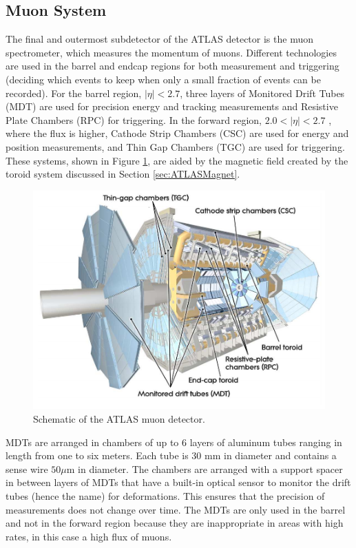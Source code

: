 \subsection{Muon System}
\label{sec:MuCal}
The final and outermost subdetector of the ATLAS detector is the muon spectrometer, which measures the momentum of muons.  Different technologies are used in the barrel and endcap regions for both measurement and triggering (deciding which events to keep when only a small fraction of events can be recorded).  For the barrel region, $|\eta|<2.7$, three layers of Monitored Drift Tubes (MDT) are used for precision energy and tracking measurements and Resistive Plate Chambers (RPC) for triggering.  In the forward region, $2.0<|\eta|<2.7$ , where the flux is higher, Cathode Strip Chambers (CSC) are used for energy and position measurements, and Thin Gap Chambers (TGC) are used for triggering.  These systems, shown in Figure \ref{fig:ATLASMuonSys}, are aided by the magnetic field created by the toroid system discussed in Section \ref{sec:ATLASMagnet}.
\begin{figure}[h!]
	\centering
	\includegraphics[width=\columnwidth]{../ThesisImages/LHCImages/ATLASMuonSystem.png}
	\caption[Schematic of the ATLAS muon detector.]{Schematic of the ATLAS muon detector.\cite{ATLAS}
	}
	\label{fig:ATLASMuonSys}
\end{figure}

MDTs are arranged in chambers of up to 6 layers of aluminum tubes ranging in length from one to six meters.  Each tube is 30 mm in diameter and contains a sense wire $50\mu\text{m}$ in diameter.  The chambers are arranged with a support spacer in between layers of MDTs that have a built-in optical sensor to monitor the drift tubes (hence the name) for deformations.  This ensures that the precision of measurements does not change over time.  The MDTs are only used in the barrel and not in the forward region because they are inappropriate in areas with high rates, in this case a high flux of muons. 

